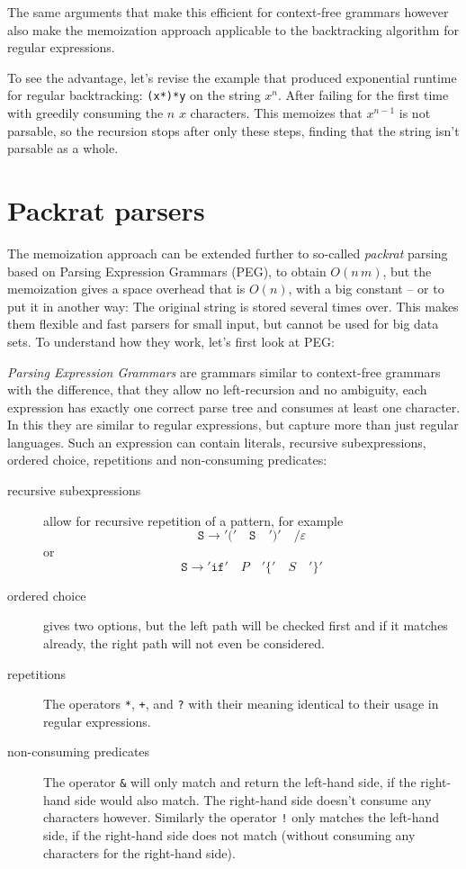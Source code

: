 \documentclass[11pt,a4paper,twoside,openright]{Thesis}
\theoremstyle{definition}
\begin{document}
The same arguments that make this efficient for context-free grammars however
also make the memoization approach applicable to the backtracking algorithm
for regular expressions.

To see the advantage, let's revise the example that produced exponential runtime
for regular backtracking: \texttt{(x*)*y} on the string $x^n$. After failing
for the first time with greedily consuming the $n$ $x$ characters. This
memoizes that $x^{n-1}$ is not parsable, so the recursion stops after only
these steps, finding that the string isn't parsable as a whole.

\section{Packrat parsers}
The memoization approach can be extended further to so-called \emph{packrat}
parsing\cite{Mede12a} based on Parsing Expression Grammars (PEG), to obtain
$O(n\,m)$, but the memoization gives a space overhead that is
$O(n)$, with a big constant\cite{Ford02a} -- or to put it in another way: The
original string is stored several times over. This makes them flexible and fast
parsers for small input, but cannot be used for big data sets. To understand
how they work, let's first look at PEG:

\emph{Parsing Expression Grammars} are grammars similar to context-free
grammars with the difference, that they allow no left-recursion and no
ambiguity, each expression has exactly one correct parse tree and consumes at
least one character. In this they are similar to regular expressions, but
capture more than just regular languages.  Such an expression can contain
literals, recursive subexpressions, ordered choice, repetitions and
non-consuming predicates:

\begin{description}
  \item[recursive subexpressions] allow for recursive repetition of a
    pattern, for example
    \[\mathtt{S} \rightarrow \mathtt{'('}\quad \mathtt{S}\quad \mathtt{')'}\quad \mathtt{/} \varepsilon \]
    or
    \[ \mathtt{S} \rightarrow \mathtt{'if'}\quad P\quad \mathtt{'\{'}\quad S\quad \mathtt{'\}'}\]
  \item[ordered choice] gives two options, but the left path will be checked
    first and if it matches already, the right path will not even be considered.
  \item[repetitions] The operators \texttt{*}, \texttt{+}, and \texttt{?}
    with their meaning identical to their usage in regular expressions.
  \item[non-consuming predicates] The operator \texttt{\&} will only match and
    return the left-hand side, if the right-hand side would also match. The
    right-hand side doesn't consume any characters however. Similarly the
    operator \texttt{!} only matches the left-hand side, if the right-hand
    side does not match (without consuming any characters for the right-hand side).
\end{description}
\end{document}
